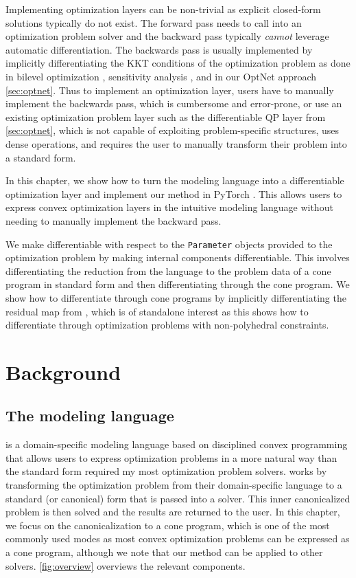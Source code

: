Implementing optimization layers can be non-trivial as explicit
closed-form solutions typically do not exist.
The forward pass needs to call into an optimization
problem solver and the backward pass typically
\emph{cannot} leverage automatic differentiation.
The backwards pass is usually implemented by implicitly
differentiating the KKT conditions of the optimization problem
as done in bilevel optimization
\citep{gould2016differentiating,kunisch2013bilevel},
sensitivity analysis
\citep{bertsekas1999nonlinear,fiacco1990sensitivity,bonnans2013perturbation},
and in our OptNet approach \cref{sec:optnet}.
Thus to implement an optimization layer, users
have to manually implement the backwards pass,
which is cumbersome and error-prone,
or use an existing optimization problem layer such as
the differentiable QP layer from \cref{sec:optnet},
which is not capable of exploiting problem-specific
structures, uses dense operations, and requires
the user to manually transform their problem into
a standard form.

In this chapter, we show how to turn the \cvxpy
modeling language \citep{diamond2016cvxpy} into
a differentiable optimization layer and
implement our method in PyTorch \citep{paszke2017automatic}.
This allows users to express convex optimization layers in
the intuitive \cvxpy modeling language without needing
to manually implement the backward pass.

We make \cvxpy differentiable with respect to the
\texttt{Parameter} objects provided to the optimization problem
by making internal \cvxpy components differentiable.
This involves differentiating the reduction from the \cvxpy
language to the problem data of a cone program in standard form
and then differentiating through the cone program.
We show how to differentiate through cone programs by
implicitly differentiating the residual map from
\citet{busseti2018solution},
which is of standalone interest as
this shows how to differentiate through optimization
problems with non-polyhedral constraints.

\section{Background}
\subsection{The \cvxpy modeling language}
\label{sec:bg:cvxpy}
\cvxpy \citep{diamond2016cvxpy}
is a domain-specific modeling language
based on disciplined convex programming
\citep{grant2006disciplined}
that allows users to express optimization problems
in a more natural way than the standard form
required my most optimization problem solvers.
\cvxpy works by transforming the optimization
problem from their domain-specific language to a
standard (or canonical) form that is passed into
a solver. This inner canonicalized problem is
then solved and the results are returned to
the user. In this chapter, we focus on the
canonicalization to a cone program, which is
one of the most commonly used modes as most convex
optimization problems can be expressed as a cone program,
although we note that our method can be
applied to other \cvxpy solvers.
\cref{fig:overview} overviews the relevant
\cvxpy components.

